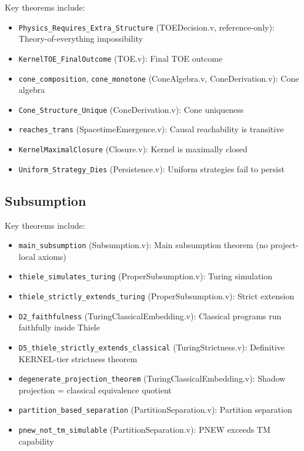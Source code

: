 Key theorems include:
\begin{itemize}
    \item \texttt{Physics\_Requires\_Extra\_Structure} (TOEDecision.v, reference-only): Theory-of-everything impossibility
    \item \texttt{KernelTOE\_FinalOutcome} (TOE.v): Final TOE outcome
    \item \texttt{cone\_composition}, \texttt{cone\_monotone} (ConeAlgebra.v, ConeDerivation.v): Cone algebra
    \item \texttt{Cone\_Structure\_Unique} (ConeDerivation.v): Cone uniqueness
    \item \texttt{reaches\_trans} (SpacetimeEmergence.v): Causal reachability is transitive
    \item \texttt{KernelMaximalClosure} (Closure.v): Kernel is maximally closed
    \item \texttt{Uniform\_Strategy\_Dies} (Persistence.v): Uniform strategies fail to persist
\end{itemize}

\subsection{Subsumption}

Key theorems include:
\begin{itemize}
    \item \texttt{main\_subsumption} (Subsumption.v): Main subsumption theorem (no project-local axioms)
    \item \texttt{thiele\_simulates\_turing} (ProperSubsumption.v): Turing simulation
    \item \texttt{thiele\_strictly\_extends\_turing} (ProperSubsumption.v): Strict extension
    \item \texttt{D2\_faithfulness} (TuringClassicalEmbedding.v): Classical programs run faithfully inside Thiele
    \item \texttt{D5\_thiele\_strictly\_extends\_classical} (TuringStrictness.v): Definitive KERNEL-tier strictness theorem
    \item \texttt{degenerate\_projection\_theorem} (TuringClassicalEmbedding.v): Shadow projection = classical equivalence quotient
    \item \texttt{partition\_based\_separation} (PartitionSeparation.v): Partition separation
    \item \texttt{pnew\_not\_tm\_simulable} (PartitionSeparation.v): PNEW exceeds TM capability
\end{itemize}

